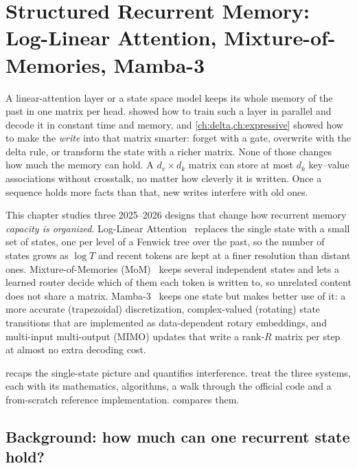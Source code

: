 \chapter{Structured Recurrent Memory: Log-Linear Attention, Mixture-of-Memories, Mamba-3}\label{ch:structured}

A linear-attention layer or a state space model keeps its whole memory of the past in one
matrix per head.  showed how to train such a layer in parallel and decode it
in constant time and memory, and \cref{ch:delta,ch:expressive} showed how to make the
\emph{write} into that matrix smarter: forget with a gate, overwrite with the delta rule, or
transform the state with a richer matrix. None of those changes how much the memory can
hold. A $d_v \times d_k$ matrix can store at most $d_k$ key--value associations without
crosstalk, no matter how cleverly it is written. Once a sequence holds more facts than that,
new writes interfere with old ones.

This chapter studies three 2025--2026 designs that change how recurrent memory
\emph{capacity is organized}. Log-Linear Attention~\citep{guo2025loglinear} replaces the
single state with a small set of states, one per level of a Fenwick tree over the past, so
the number of states grows as $\log T$ and recent tokens are kept at a finer resolution than
distant ones. Mixture-of-Memories (MoM)~\citep{du2025mom} keeps several independent states
and lets a learned router decide which of them each token is written to, so unrelated
content does not share a matrix. Mamba-3~\citep{lahoti2026mamba3} keeps one state but makes
better use of it: a more accurate (trapezoidal) discretization, complex-valued (rotating)
state transitions that are implemented as data-dependent rotary embeddings, and
multi-input multi-output (MIMO) updates that write a rank-$R$ matrix per step at almost no
extra decoding cost.

 recaps the single-state picture and quantifies interference.
 treat the three systems, each with its
mathematics, algorithms, a walk through the official code and a from-scratch reference
implementation.  compares them.

\section{Background: how much can one recurrent state hold?}\label{sec:c07-background}

